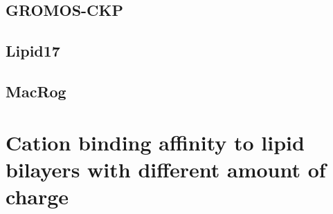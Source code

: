 \documentclass[aps,prl,superscriptaddress,twocolumn]{revtex4}
\begin{document}
\subsection{GROMOS-CKP}

\subsection{Lipid17}

\subsection{MacRog}


\section{Cation binding affinity to lipid bilayers with different amount of charge}
\end{document}
